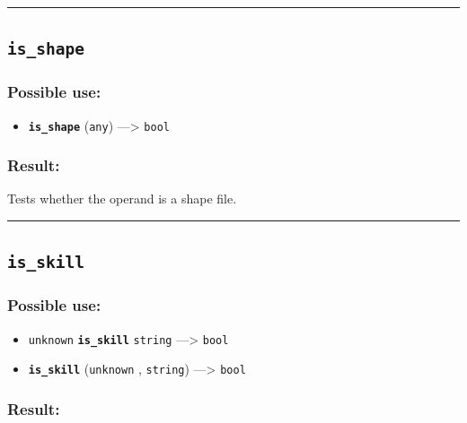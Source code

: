 \documentclass[]{book}
\providecommand{\tightlist}{%
  \setlength{\itemsep}{0pt}\setlength{\parskip}{0pt}}
\theoremstyle{definition}
\theoremstyle{definition}
\theoremstyle{definition}
\theoremstyle{remark}
\begin{document}
\begin{center}\rule{0.5\linewidth}{\linethickness}\end{center}

\subsection{\texorpdfstring{\texttt{is\_shape}}{is\_shape}}\label{is_shape}

\subsubsection{Possible use:}\label{possible-use-302}

\begin{itemize}
\tightlist
\item
  \textbf{\texttt{is\_shape}} (\texttt{any}) ---\textgreater{}
  \texttt{bool}
\end{itemize}

\subsubsection{Result:}\label{result-292}

Tests whether the operand is a shape file.

\begin{center}\rule{0.5\linewidth}{\linethickness}\end{center}

\subsection{\texorpdfstring{\texttt{is\_skill}}{is\_skill}}\label{is_skill}

\subsubsection{Possible use:}\label{possible-use-303}

\begin{itemize}
\tightlist
\item
  \texttt{unknown} \textbf{\texttt{is\_skill}} \texttt{string}
  ---\textgreater{} \texttt{bool}
\item
  \textbf{\texttt{is\_skill}} (\texttt{unknown} , \texttt{string})
  ---\textgreater{} \texttt{bool}
\end{itemize}

\subsubsection{Result:}\label{result-293}
\end{document}
